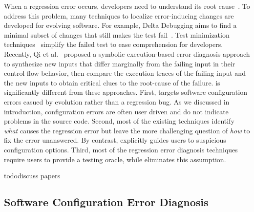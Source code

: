When a regression error occurs, developers need
to understand its root cause~\cite{Banerjee:2010:GID, r2fix}. To address this
problem, many techniques to localize error-inducing
changes are developed for evolving
software. For example, Delta Debugging aims to find a minimal
subset of changes that still makes the test fail~\cite{}.
Test minimization techniques~\cite{} simplify the failed
test to ease comprehension for developers. Recently,
Qi et al.~\cite{} proposed a symbolic execution-based
error diagnosis approach to synthesize new inputs that
differ marginally from the failing input in their
control flow behavior, then compare the execution traces
of the failing input and the new inputs to obtain critical
clues to the root-cause of the failure. \ourtool
is significantly different from these approaches.
First, \ourtool targets software configuration errors
casued by evolution rather than a regression bug.
As we discussed in introduction, configuration errors are
often user driven and do not indicate problems in the source
code. Second, most of the existing techniques identify
\textit{what} causes the regression error but leave
the more challenging question of \textit{how} to
fix the error unanswered. By contrast, \ourtool
explicitly guides users to suspicious configuration options.
Third, most of the regression error diagnosis techniques
require users to provide a testing oracle, while \ourtool
eliminates this assumption. 

todo{discuss papers~\cite{Grechanik:2009:MEG, Fischer:2005:SET, Mostafa:2009:TPA,
publication-8111}}


\subsection{Software Configuration Error Diagnosis}

